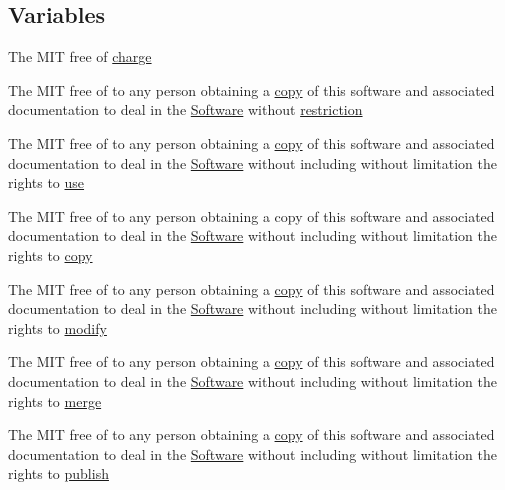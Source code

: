 \subsection*{Variables}
\begin{DoxyCompactItemize}
\item 
The M\+IT free of \hyperlink{LICENSE_8txt_aebc511ed3f15c16125b74aa0f22cfa10}{charge}
\item 
The M\+IT free of to any person obtaining a \hyperlink{LICENSE_8txt_aff1d4c6b756ebf691fa44a0904f68658}{copy} of this software and associated documentation to deal in the \hyperlink{LICENSE_8txt_a22a1529885b3e9d66b0c72fe604fc3dc}{Software} without \hyperlink{LICENSE_8txt_ac0e1e4a858a6a19c5392f7f6d29f969c}{restriction}
\item 
The M\+IT free of to any person obtaining a \hyperlink{LICENSE_8txt_aff1d4c6b756ebf691fa44a0904f68658}{copy} of this software and associated documentation to deal in the \hyperlink{LICENSE_8txt_a22a1529885b3e9d66b0c72fe604fc3dc}{Software} without including without limitation the rights to \hyperlink{LICENSE_8txt_ab8202310c90e99c59d9ea1f58f920a91}{use}
\item 
The M\+IT free of to any person obtaining a copy of this software and associated documentation to deal in the \hyperlink{LICENSE_8txt_a22a1529885b3e9d66b0c72fe604fc3dc}{Software} without including without limitation the rights to \hyperlink{LICENSE_8txt_aff1d4c6b756ebf691fa44a0904f68658}{copy}
\item 
The M\+IT free of to any person obtaining a \hyperlink{LICENSE_8txt_aff1d4c6b756ebf691fa44a0904f68658}{copy} of this software and associated documentation to deal in the \hyperlink{LICENSE_8txt_a22a1529885b3e9d66b0c72fe604fc3dc}{Software} without including without limitation the rights to \hyperlink{LICENSE_8txt_a4f5fee3fe655fc467fc80425521837ae}{modify}
\item 
The M\+IT free of to any person obtaining a \hyperlink{LICENSE_8txt_aff1d4c6b756ebf691fa44a0904f68658}{copy} of this software and associated documentation to deal in the \hyperlink{LICENSE_8txt_a22a1529885b3e9d66b0c72fe604fc3dc}{Software} without including without limitation the rights to \hyperlink{LICENSE_8txt_a7653d3ec339e97ccc64ec4f74e440441}{merge}
\item 
The M\+IT free of to any person obtaining a \hyperlink{LICENSE_8txt_aff1d4c6b756ebf691fa44a0904f68658}{copy} of this software and associated documentation to deal in the \hyperlink{LICENSE_8txt_a22a1529885b3e9d66b0c72fe604fc3dc}{Software} without including without limitation the rights to \hyperlink{LICENSE_8txt_ae6b6c4d3ae1a4140d31294e27bb0ebd8}{publish}

\end{DoxyCompactItemize}
